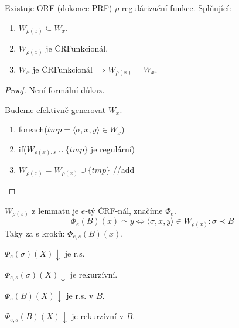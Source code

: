\begin{lemma}\label{reg_func}
	Existuje ORF (dokonce PRF) $\rho$ regulárizační funkce.
	Splňující:
	\begin{enumerate}
		\item $W_{\rho(x)} \subseteq W_x$.
		\item $W_{\rho(x)}$ je ČRFunkcionál.
		\item $W_x$ je ČRFunkcionál $\Rightarrow W_{\rho(x)} = W_x$.
	\end{enumerate}
\end{lemma}
\begin{proof}
	Není formální důkaz.

	Budeme efektivně generovat $W_x$.

	\begin{enumerate}
		\item foreach($tmp = \langle \sigma, x, y \rangle \in W_x$)
		\item \tab if($W_{\rho(x), s} \cup \{tmp\}$ je regulární)
		\item \tab \tab $W_{\rho(x)} = W_{\rho(x)} \cup \{tmp\}$ //add
	\end{enumerate}
\end{proof}

\begin{definition}
	$W_{\rho(x)}$ z lemmatu je $e$-tý ČRF-nál, značíme $\Phi_e$.
	\[ \Phi_e(B)(x) \simeq y \iff \langle \sigma, x, y \rangle \in W_{\rho(x)}: \sigma \prec B \]
	Taky za s kroků: $\Phi_{e, s}(B)(x)$.
\end{definition}

\begin{observation}
	$\Phi_e(\sigma)(X) \downarrow$ je r.s.

	$\Phi_{e, s}(\sigma)(X) \downarrow$ je rekurzívní.

	$\Phi_e(B)(X) \downarrow$ je r.s. v $B$.

	$\Phi_{e, s}(B)(X) \downarrow$ je rekurzívní v $B$.
\end{observation}


